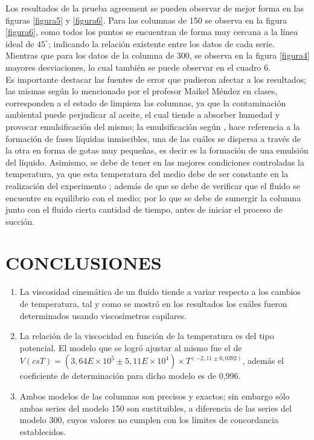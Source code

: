\documentclass[12, letterpaper]{article}
\begin{document}
Los resultados de la prueba agreement se pueden observar de mejor forma en las figuras \ref{figura5} y \ref{figura6}. Para las columnas de 150 se observa en la figura \ref{figura6}, como todos los puntos se encuentran de forma muy cercana a la línea ideal de $45^{\circ}$; indicando la relación existente entre los datos de cada serie. Mientras que para los datos de la columna de 300, se observa en la figura \ref{figura4} mayores desviaciones, lo cual también se puede observar en el cuadro 6.\\ 
Es importante destacar las fuentes de error que pudieron afectar a los resultados; las mismas según lo mencionado por el profesor Maikel Méndez en clases, corresponden a el estado de limpieza las columnas, ya que la contaminación ambiental puede perjudicar al aceite, el cual tiende a absorber humedad y provocar emulsificación del mismo; la emulsificación según \cite{chow}, hace referencia a la formación de fases líquidas inmiscibles, una de las cuáles se dispersa a través de la otra en forma de gotas muy pequeñas, es decir es la formación de una  emulsión del líquido. Asimismo, se debe de tener en las mejores condiciones controladas la temperatura, ya que esta temperatura del medio debe de ser constante en la realización del experimento \cite{coleparmer}; además de que se debe de verificar que el fluido se encuentre en equilibrio con el medio; por lo que se debe de sumergir la columna junto con el fluido cierta cantidad de tiempo, antes de iniciar el proceso de succión.\\

\section{CONCLUSIONES}

\begin{enumerate}
    \item La viscosidad cinemática de un fluido tiende a variar respecto a los cambios de temperatura, tal y como se mostró en los resultados los cuáles fueron determinados usando viscosímetros capilares. 
    \item La relación de la viscocidad en función de la temperatura es del tipo potencial. El modelo que se logró ajustar al mismo fue el de$V(csT)= (3,64E\times10^{5} \pm 5,11E\times10^{4}) \times T^{(-2,11 \pm 0,0392)}$, además el coeficiente de determinación para dicho modelo es de 0,996.
    \item Ambos modelos de las columnas son precisos y exactos; sin embargo sólo ambas series del modelo 150 son sustituibles, a diferencia de las series del modelo 300, cuyos valores no cumplen con los límites de concordancia establecidos.
\end{enumerate}
\end{document}
